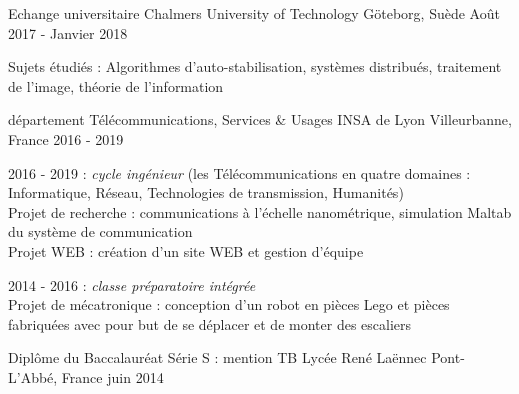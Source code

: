 

\begin{cventries}

  \cventry
    {Echange universitaire} %
    {Chalmers University of Technology} %
    {Göteborg, Suède} %
    {Août 2017 - Janvier 2018} %
    {
      \begin{cvitems} %
        \item {Sujets étudiés : Algorithmes d'auto-stabilisation, systèmes distribués, traitement de l'image, théorie de l'information}
      \end{cvitems}
    }

  \cventry
    {département Télécommunications, Services \& Usages} %
    {INSA de Lyon} %
    {Villeurbanne, France} %
    {2016 - 2019} %
    {
      \begin{cvitems} %
        \item {2016 - 2019 : \emph{cycle ingénieur} (les Télécommunications en quatre domaines : Informatique, Réseau, Technologies de transmission, Humanités) \\Projet de recherche : communications à l'échelle nanométrique, simulation Maltab du système de communication \\Projet WEB : création d'un site WEB et gestion d'équipe}
        \item {2014 - 2016 : \emph{classe préparatoire intégrée} \\Projet de mécatronique : conception d'un robot en pièces Lego et pièces fabriquées avec pour but de se déplacer et de monter des escaliers}
      \end{cvitems}
    } 
  \cventryS
    {Diplôme du Baccalauréat Série S : mention TB} %
    {Lycée René Laënnec} %
    {Pont-L'Abbé, France} %
    {juin 2014} %
    
\end{cventries}

